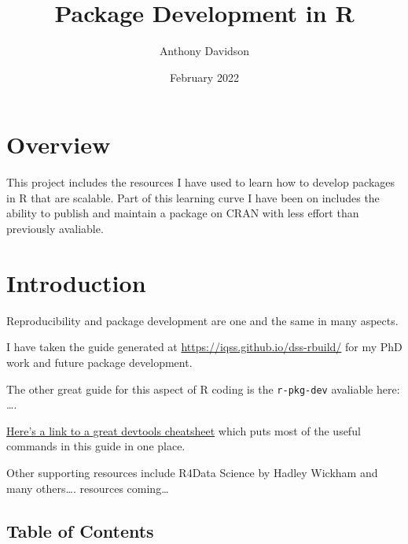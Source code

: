 \documentclass[
]{book}
\title{Package Development in R}
\author{Anthony Davidson}
\date{February 2022}
\newenvironment{Shaded}{\begin{snugshade}}{\end{snugshade}}
\newcommand{\AttributeTok}[1]{\textcolor[rgb]{0.77,0.63,0.00}{#1}}
\newcommand{\ConstantTok}[1]{\textcolor[rgb]{0.00,0.00,0.00}{#1}}
\newcommand{\FunctionTok}[1]{\textcolor[rgb]{0.00,0.00,0.00}{#1}}
\newcommand{\NormalTok}[1]{#1}
\newcommand{\SpecialCharTok}[1]{\textcolor[rgb]{0.00,0.00,0.00}{#1}}
\begin{document}
\maketitle

{
\setcounter{tocdepth}{1}
\tableofcontents
}
\begin{Shaded}
\end{Shaded}

\hypertarget{overview}{%
\chapter{Overview}\label{overview}}

This project includes the resources I have used to learn how to develop packages in R that are scalable. Part of this learning curve I have been on includes the ability to publish and maintain a package on CRAN with less effort than previously avaliable.

\hypertarget{introduction}{%
\chapter*{Introduction}\label{introduction}}

Reproducibility and package development are one and the same in many aspects.

I have taken the guide generated at \url{https://iqss.github.io/dss-rbuild/} for my PhD work and future package development.

The other great guide for this aspect of R coding is the \texttt{r-pkg-dev} avaliable here: \ldots.

\href{https://www.rstudio.com/wp-content/uploads/2015/03/devtools-cheatsheet.pdf}{Here's a link to a great devtools cheatsheet} which puts most of the useful commands in this guide in one place.

Other supporting resources include R4Data Science by Hadley Wickham and many others\ldots. resources coming\ldots{}

\hypertarget{table-of-contents}{%
\section*{Table of Contents}\label{table-of-contents}}
\end{document}
